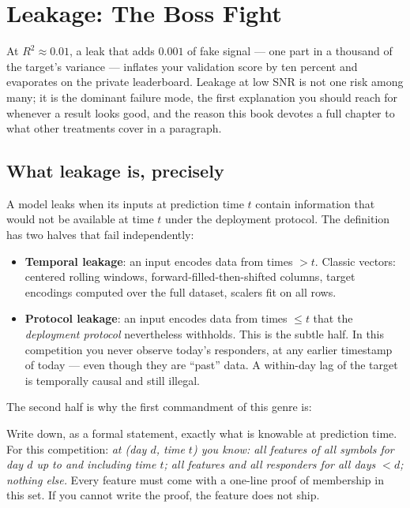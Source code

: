 \chapter{Leakage: The Boss Fight}
\label{ch:leakage}

At $R^2 \approx 0.01$, a leak that adds $0.001$ of fake signal --- one part
in a thousand of the target's variance --- inflates your validation score by
ten percent and evaporates on the private leaderboard. Leakage at low SNR is
not one risk among many; it is the dominant failure mode, the first
explanation you should reach for whenever a result looks good, and the
reason this book devotes a full chapter to what other treatments cover in a
paragraph.

\section{What leakage is, precisely}

A model leaks when its inputs at prediction time $t$ contain information
that would not be available at time $t$ under the deployment protocol.
The definition has two halves that fail independently:

\begin{itemize}
\item \textbf{Temporal leakage}: an input encodes data from times $> t$.
  Classic vectors: centered rolling windows, forward-filled-then-shifted
  columns, target encodings computed over the full dataset, scalers fit on
  all rows.
\item \textbf{Protocol leakage}: an input encodes data from times $\le t$
  that the \emph{deployment protocol} nevertheless withholds. This is the
  subtle half. In this competition you never observe today's responders,
  at any earlier timestamp of today --- even though they are ``past''
  data. A within-day lag of the target is temporally causal and still
  illegal.
\end{itemize}

The second half is why the first commandment of this genre is:

\begin{keybox}
Write down, as a formal statement, exactly what is knowable at prediction
time. For this competition: \emph{at (day $d$, time $t$) you know: all
features of all symbols for day $d$ up to and including time $t$; all
features and all responders for all days $< d$; nothing else.} Every
feature must come with a one-line proof of membership in this set. If you
cannot write the proof, the feature does not ship.
\end{keybox}

